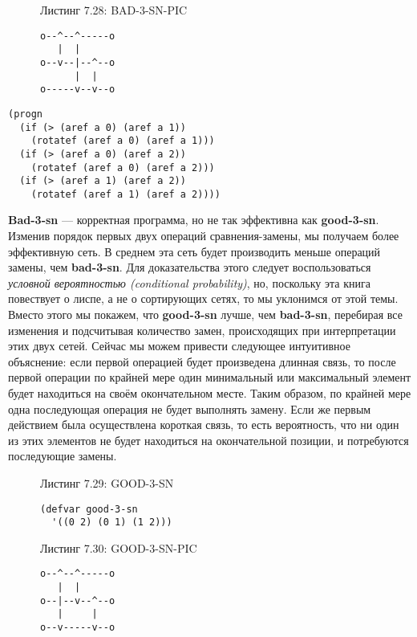 \begin{figure}Листинг 7.28: BAD-3-SN-PIC\label{listing_7.28}
\listbegin
\begin{verbatim}
o--^--^-----o
   |  |
o--v--|--^--o
      |  |
o-----v--v--o
\end{verbatim}
\listend
\end{figure}

\begin{verbatim}
(progn
  (if (> (aref a 0) (aref a 1))
    (rotatef (aref a 0) (aref a 1)))
  (if (> (aref a 0) (aref a 2))
    (rotatef (aref a 0) (aref a 2)))
  (if (> (aref a 1) (aref a 2))
    (rotatef (aref a 1) (aref a 2))))
\end{verbatim}

\textbf{Bad-3-sn} --- корректная программа, но не так эффективна как \textbf{good-3-sn}. Изменив порядок первых двух операций сравнения-замены, мы получаем более эффективную сеть. В среднем эта сеть будет производить меньше операций замены, чем \textbf{bad-3-sn}. Для доказательства этого следует воспользоваться \emph{условной вероятностью (conditional probability)}, но, поскольку эта книга повествует о лиспе, а не о сортирующих сетях, то мы уклонимся от этой темы. Вместо этого мы покажем, что \textbf{good-3-sn} лучше, чем \textbf{bad-3-sn}, перебирая все изменения и подсчитывая количество замен, происходящих при интерпретации этих двух сетей. Сейчас мы можем привести следующее интуитивное объяснение: если первой операцией будет произведена длинная связь, то после первой операции по крайней мере один минимальный или максимальный элемент будет находиться на своём окончательном месте. Таким образом, по крайней мере одна последующая операция не будет выполнять замену. Если же первым действием была осуществлена короткая связь, то есть вероятность, что ни один из этих элементов не будет находиться на окончательной позиции, и потребуются последующие замены.

\begin{figure}Листинг 7.29: GOOD-3-SN\label{listing_7.29}
\listbegin
\begin{verbatim}
(defvar good-3-sn
  '((0 2) (0 1) (1 2))) 
\end{verbatim}
\listend
\end{figure}

\begin{figure}Листинг 7.30: GOOD-3-SN-PIC\label{listing_7.30}
\listbegin
\begin{verbatim}
o--^--^-----o
   |  |
o--|--v--^--o
   |     |
o--v-----v--o
\end{verbatim}
\listend
\end{figure}

